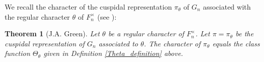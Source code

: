 \documentclass[reqno]{amsart}
\newtheorem{thm}{Theorem}[section]
\theoremstyle{definition}
\theoremstyle{remark}
\numberwithin{equation}{section}
\begin{document}
We recall the character of the cuspidal representation $\pi_\theta$ of $G_n$ associated with the regular character $\theta$ of $F_n^\times$ (see \cite{Gel[1], Dip[1]}):
\begin{thm} [J.A. Green]  
\label{character value of cuspidal representation (Dipendra)}
Let $\theta$ be a regular character of $F^{\times}_{n}$. Let $\pi=\pi_{\theta}$ be the cuspidal representation of $G_n$ associated to $\theta$. The character of $\pi_\theta$ equals the class function $\Theta_{\theta}$ given in Definition \ref{Theta_definition} above.

\end{thm}
  
\end{document}
